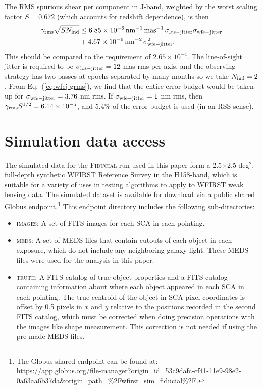 \documentclass[usenatbib]{mnras}
\begin{document}
The RMS spurious shear per component in J-band, weighted by the worst scaling factor $S = 0.672$ (which accounts for redshift dependence), is then
\begin{align}
\gamma_{\rm rms}\sqrt{S N_{\rm ind}} &\le 6.85\times 10^{-6}\,{\rm
nm}^{-1}\,{\rm mas}^{-1}\,\sigma_{\rm los-jitter}\sigma_{\rm
wfe-jitter} \nonumber\\
&+ 4.67\times 10^{-6} \,{\rm nm}^{-2}\,\sigma_{\rm
wfe-jitter}^2.
\label{eq:wfej-grms}
\end{align}
This should be compared to the requirement of $2.65\times 10^{-4}$. The line-of-sight jitter is required to be $\sigma_{\rm los-jitter}=12$ mas rms per axis, and the observing strategy has two passes at epochs separated by many months so we take $N_{\rm ind}=2$. From Eq.~(\ref{eq:wfej-grms}), we find that the entire error budget would be taken up for $\sigma_{\rm wfe-jitter}=3.76$ nm rms. If $\sigma_{\rm wfe-jitter}=1$ nm rms, then $\gamma_{\rm rms}S^{1/2}=6.14\times 10^{-5}$, and 5.4\% of the error budget is used (in an RSS sense).

\section{Simulation data access}
\label{app:data_access}

The simulated data for the \textsc{Fiducial} run used in this paper form a 2.5$\times$2.5 deg$^2$, full-depth synthetic WFIRST Reference Survey in the H158-band, which is suitable for a variety of uses in testing algorithms to apply to WFIRST weak lensing data. The simulated dataset is available for download via a public shared Globus endpoint.\footnote{The Globus shared endpoint can be found at: \\\url{https://app.globus.org/file-manager?origin_id=53c9dafc-cf41-11e9-98e2-0a63aa6b37da&origin_path=\%2Fwfirst_sim_fiducial\%2F}.}  This endpoint directory includes the following sub-directories:

\begin{itemize}
\item \textsc{images}: A set of FITS images for each SCA in each pointing. 
\item \textsc{meds}: A set of MEDS files that contain cutouts of each object in each exposure, which do not include any neighboring galaxy light. These MEDS files were used for the analysis in this paper. 
\item \textsc{truth}: A FITS catalog of true object properties and a FITS catalog containing information about where each object appeared in each SCA in each pointing. The true centroid of the object in SCA pixel coordinates is offset by 0.5 pixels in $x$ and $y$ relative to the positions recorded in the second FITS catalog, which must be corrected when doing precision operations with the images like shape measurement. This correction is not needed if using the pre-made MEDS files.
\end{itemize}
\end{document}
